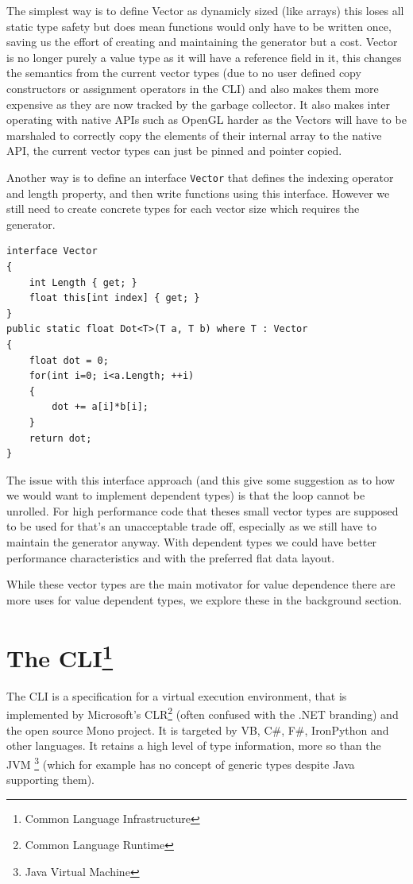 \documentclass[english]{report}
\begin{document}
The simplest way is to define Vector as dynamicly sized (like arrays)
this loses all static type safety but does mean functions would only
have to be written once, saving us the effort of creating and maintaining
the generator but a cost. Vector is no longer purely a value type
as it will have a reference field in it, this changes the semantics
from the current vector types (due to no user defined copy constructors
or assignment operators in the CLI) and also makes them more expensive
as they are now tracked by the garbage collector. It also makes inter
operating with native APIs such as OpenGL harder as the Vectors will
have to be marshaled to correctly copy the elements of their internal
array to the native API, the current vector types can just be pinned
and pointer copied.

Another way is to define an interface \texttt{Vector} that defines
the indexing operator and length property, and then write functions
using this interface. However we still need to create concrete types
for each vector size which requires the generator.

\begin{lstlisting}[keywordstyle={\color{blue}},language=sharpc]
interface Vector
{
	int Length { get; }
	float this[int index] { get; }
}
public static float Dot<T>(T a, T b) where T : Vector
{
	float dot = 0;
	for(int i=0; i<a.Length; ++i)
	{
		dot += a[i]*b[i];
	}
	return dot;
}
\end{lstlisting}


The issue with this interface approach (and this give some suggestion
as to how we would want to implement dependent types) is that the
loop cannot be unrolled. For high performance code that theses small
vector types are supposed to be used for that's an unacceptable trade
off, especially as we still have to maintain the generator anyway.
With dependent types we could have better performance characteristics
and with the preferred flat data layout. 

While these vector types are the main motivator for value dependence
there are more uses for value dependent types, we explore these in
the background section.

\section{\texorpdfstring{The CLI\footnote{Common Language Infrastructure}}%
{The Common Language Infrastructure}}

The CLI is a specification for a virtual execution environment, that
is implemented by Microsoft's CLR\footnote{Common Language Runtime}
(often confused with the .NET branding) and the open source Mono
project. It is targeted by VB, C\#, F\#, IronPython and other languages.
It retains a high level of type information, more so than the JVM
\footnote{Java Virtual Machine} 
(which for example has no concept of generic types despite Java supporting
them\cite{jvm-erasure}).
\end{document}
